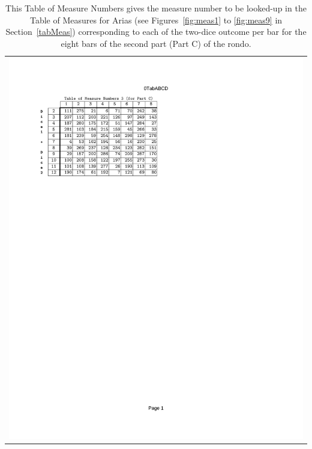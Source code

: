\documentclass[a4paper,x11names,svgnames,10pt]{article}
\begin{document}
{\begin{table}[H]
	\centering
	\begin{tabular}{c}
		\centering
		\includegraphics[clip=true,trim=0.75in 7.50in 3.75in 1.10in,scale=0.90]{0TAB-C}
	\end{tabular}
	\caption{This Table of Measure Numbers gives the measure number to be looked-up in the Table of Measures for Arias (see Figures~\ref{fig:meas1} to \ref{fig:meas9} in Section~\ref{tabMeas}) corresponding to each of the two-dice outcome per bar for the eight bars of the second part (Part C) of the rondo.}
	\label{tab:find3}
\end{table}

}
\end{document}
